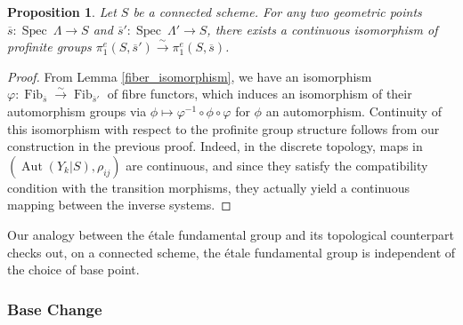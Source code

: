 \documentclass{article}
\theoremstyle{plain}
\newtheorem{proposition}[theorem]{Proposition}
\theoremstyle{definition}
\DeclareMathOperator{\Fib}{Fib}
\DeclareMathOperator{\Aut}{Aut}
\DeclareMathOperator{\Spec}{Spec}
\begin{document}
\begin{proposition}
    Let $S$ be a connected scheme. For any two geometric points $\overline{s}:\Spec\:\Lambda\rightarrow S$ and $\overline{s}':\Spec\:\Lambda'\rightarrow S$, there exists a continuous isomorphism of profinite groups $\pi^e_1(S,\overline{s}')\xrightarrow{\sim} \pi^e_1(S,\overline{s})$.
\end{proposition}
\begin{proof}
    From Lemma \ref{fiber_isomorphism}, we have an isomorphism $\varphi : \Fib_{\overline{s}}\xrightarrow{\sim}\Fib_{\overline{s}'}$ of fibre functors, which induces an isomorphism of their automorphism groups via $\phi\mapsto \varphi^{-1}\circ\phi\circ\varphi$ for $\phi$ an automorphism.
    Continuity of this isomorphism with respect to the profinite group structure follows from our construction in the previous proof. 
    Indeed, in the discrete topology, maps in $(\Aut(Y_k|S),\rho_{ij})$ are continuous, and since they satisfy the compatibility condition with the transition morphisms, they actually yield a continuous mapping between the inverse systems.
\end{proof}

\noindent Our analogy between the \'etale fundamental group and its topological counterpart checks out, on a connected scheme, the \'etale fundamental group is independent of the choice of base point. 



\subsubsection{Base Change}
\end{document}
